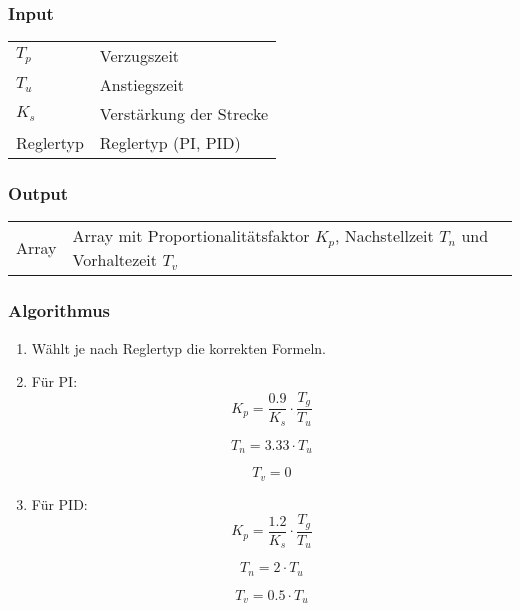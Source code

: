 \subsubsection*{Input}

\begin{tabular}{p{40mm}l}
    $ T_p $        & Verzugszeit \\
    $ T_u $        & Anstiegszeit \\
    $ K_s $        & Verst\"arkung der Strecke \\
      Reglertyp   & Reglertyp (PI, PID)
\end{tabular}

\subsubsection*{Output}
\begin{tabular}{p{40mm}l}
    Array & \parbox[t][4em][s]{0.7\textwidth}{Array mit Proportionalit\"atsfaktor $ K_p $, Nachstellzeit $ T_n $ und Vorhaltezeit $ T_v $}
\end{tabular}

\subsubsection*{Algorithmus}
\begin{enumerate}
    \item
        W\"ahlt je nach Reglertyp die korrekten Formeln.
    \item
        F\"ur PI:
        \begin{equation*}
            K_p= \frac{0.9}{K_s} \cdot \frac{T_g}{T_u}
        \end{equation*}

        \begin{equation*}
            T_n=3.33 \cdot T_u
        \end{equation*}

        \begin{equation*}
            T_v=0
        \end{equation*}
    \item
        F\"ur PID:
        \begin{equation*}
            K_p = \frac{1.2}{K_s} \cdot \frac{T_g}{T_u}
        \end{equation*}

        \begin{equation*}
            T_n=2 \cdot T_u
        \end{equation*}

        \begin{equation*}
            T_v = 0.5 \cdot T_u
        \end{equation*}
\end{enumerate}

